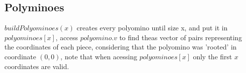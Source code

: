 \subsection{Polyminoes}

$buildPolyominoes(x)$ creates every polyomino until size x, and put it in $polyominoes[x]$, access $polyomino.v$ to find theas vector of pairs representing the coordinates of each piece, considering that the polyomino was 'rooted' in coordinate $(0,0)$, note that when acessing $polyominoes[x]$ only the first $x$ coordinates are valid.

